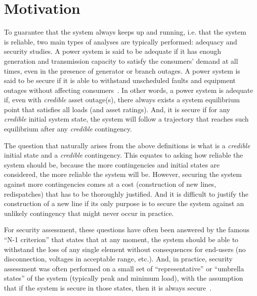 \section{Motivation}

To guarantee that the system always keeps up and running, i.e. that the system is reliable,  two main types of analyses are typically performed: adequacy and security studies. A power system is said to be adequate if it has enough generation and transmission capacity to satisfy the consumers' demand at all times, even in the presence of generator or branch outages. A power system is said to be secure if it is able to withstand unscheduled faults and equipment outages without affecting consumers~\cite{AdequancySecurityDefinition}. In other words, a power system is adequate if, even with \emph{credible} asset outage(s), there always exists a system equilibrium point that satisfies all loads (and asset ratings). And, it is secure if for any \emph{credible} initial system state, the system will follow a trajectory that reaches such equilibrium after any \emph{credible} contingency.

The question that naturally arises from the above definitions is what is a \emph{credible} initial state and a \emph{credible} contingency. This equates to asking how reliable the system should be, because the more contingencies and initial states are considered, the more reliable the system will be. However, securing the system against more contingencies comes at a cost (construction of new lines, redispatches) that has to be thoroughly justified. And it is difficult to justify the construction of a new line if its only purpose is to secure the system against an unlikely contingency that might never occur in practice.

For security assessment, these questions have often been answered by the famous ``N-1 criterion'' that states that at any moment, the system should be able to withstand the loss of any single element without consequences for end-users (no disconnection, voltages in acceptable range, etc.). And, in practice, security assessment was often performed on a small set of ``representative'' or ``umbrella states'' of the system (typically peak and minimum load), with the assumption that if the system is secure in those states, then it is always secure~\cite{CIGREreviewOfTools}.

